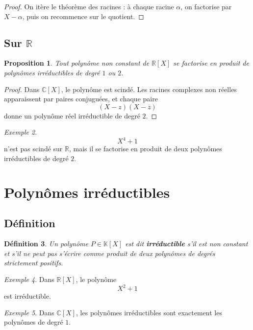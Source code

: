 \documentclass[11pt,a4paper]{article}
\newtheorem{definition}{Définition}[section]
\newtheorem{proposition}[definition]{Proposition}
\theoremstyle{remark}
\newtheorem{exemple}[definition]{Exemple}
\newcommand{\R}{\mathbb{R}}
\newcommand{\C}{\mathbb{C}}
\newcommand{\K}{\mathbb{K}}
\begin{document}
\begin{proof}
On itère le théorème des racines : à chaque racine \(\alpha\), on factorise par \(X-\alpha\), puis on recommence sur le quotient.
\end{proof}

\subsection{Sur \(\R\)}

\begin{proposition}
Tout polynôme non constant de \(\R[X]\) se factorise en produit de polynômes irréductibles de degré \(1\) ou \(2\).
\end{proposition}

\begin{proof}
Dans \(\C[X]\), le polynôme est scindé. Les racines complexes non réelles apparaissent par paires conjuguées, et chaque paire
\[
(X-z)(X-\overline z)
\]
donne un polynôme réel irréductible de degré \(2\).
\end{proof}

\begin{exemple}
\[
X^4+1
\]
n’est pas scindé sur \(\R\), mais il se factorise en produit de deux polynômes irréductibles de degré \(2\).
\end{exemple}

\section{Polynômes irréductibles}

\subsection{Définition}

\begin{definition}
Un polynôme \(P\in\K[X]\) est dit \textbf{irréductible} s’il est non constant et s’il ne peut pas s’écrire comme produit de deux polynômes de degrés strictement positifs.
\end{definition}

\begin{exemple}
Dans \(\R[X]\), le polynôme
\[
X^2+1
\]
est irréductible.
\end{exemple}

\begin{exemple}
Dans \(\C[X]\), les polynômes irréductibles sont exactement les polynômes de degré \(1\).
\end{exemple}
\end{document}
